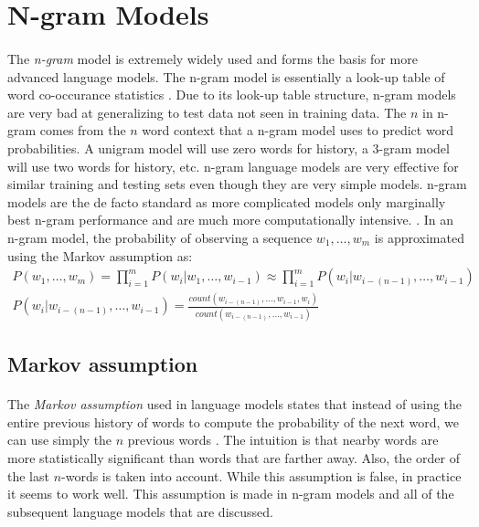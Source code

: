 \section{N-gram Models}
\paragraph{}
The \emph{n-gram} model is extremely widely used and forms the basis for more advanced language models. The n-gram model is essentially a look-up table of word co-occurance statistics \cite{Jurafsky2009}. Due to its look-up table structure, n-gram models are very bad at generalizing to test data not seen in training data. The $n$ in n-gram comes from the $n$ word context that a n-gram model uses to predict word probabilities. A unigram model will use zero words for history, a 3-gram model will use two words for history, etc. n-gram language models are very effective for similar training and testing sets even though they are very simple models. n-gram models are the de facto standard as more complicated models only marginally best n-gram performance and are much more computationally intensive. \cite{Mikolov2012}. 
In an n-gram model, the probability of observing a sequence $w_1, \dots, w_m$ is approximated using the Markov assumption as:
\begin{align}
P(w_1,\dots,w_m) = \prod^{m}_{i=1} P(w_i|w_1,\dots, w_{i-1}) \approx  \prod^{m}_{i=1} P(w_i | w_{i-(n-1)},\dots, w_{i-1}) 
\\P(w_i | w_{i-(n-1)},\dots, w_{i-1}) = \frac{count(w_{i-(n-1)},\dots,w_{i-1},w_i)}{count(w_{i-(n-1)},\dots,w_{i-1})}
\end{align}
\subsection{Markov assumption}
\paragraph{}
The \emph{Markov assumption} used in language models states that instead of using the entire previous history of words to compute the probability of the next word, we can use simply the $n$ previous words \cite{Jurafsky2009}. The intuition is that nearby words are more statistically significant than words that are farther away. Also, the order of the last $n$-words is taken into account. While this assumption is false, in practice it seems to work well. This assumption is made in n-gram models and all of the subsequent language models that are discussed.
